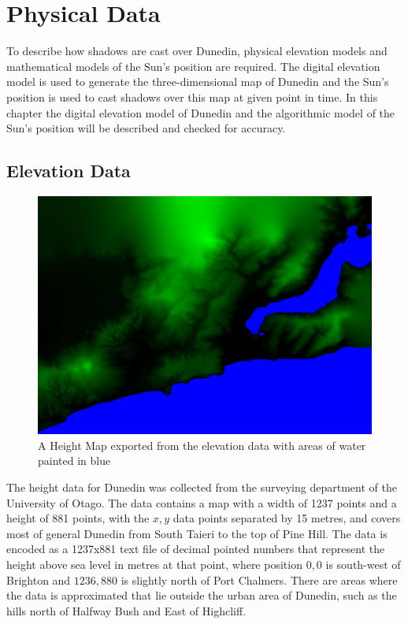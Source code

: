 \documentclass[12pt]{report}
\begin{document}
\chapter{Physical Data}
To describe how shadows are cast over Dunedin, physical elevation models and mathematical models of the Sun's position are required. The digital elevation model is used to generate the three-dimensional map of Dunedin and the Sun's position is used to cast shadows over this map at given point in time. In this chapter the digital elevation model of Dunedin and the algorithmic model of the Sun's position will be described and checked for accuracy.

\section{Elevation Data}

\begin{figure}[h]
\includegraphics[width=\textwidth]{heightmapandwater.png}
\caption{A Height Map exported from the elevation data with areas of water painted in blue}
\label{image:elevation-water}
\end{figure}
The height data for Dunedin was collected from the surveying department of the University of Otago. The data contains a map with a width of 1237 points and a height of 881 points, with the $x,y$ data points separated by 15 metres, and covers most of general Dunedin from South Taieri to the top of Pine Hill. The data is encoded as a 1237x881 text file of decimal pointed numbers that represent the height above sea level in metres at that point, where position $0,0$ is south-west of Brighton and $1236,880$ is slightly north of Port Chalmers. There are areas where the data is approximated that lie outside the urban area of Dunedin, such as the hills north of Halfway Bush and East of Highcliff.
\end{document}
